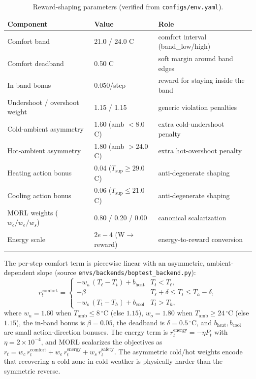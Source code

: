 \documentclass[11pt,a4paper]{article}
\begin{document}
\begin{table}[H]
\centering
\caption{Reward-shaping parameters (verified from \texttt{configs/env.yaml}).}
\label{tab:reward}
\small
\begin{tabularx}{\linewidth}{llX}
\toprule
Component & Value & Role \\
\midrule
Comfort band & 21.0 / 24.0 C & comfort interval (band\_low/high) \\
Comfort deadband & 0.50 C & soft margin around band edges \\
In-band bonus & 0.050/step & reward for staying inside the band \\
Undershoot / overshoot weight & 1.15 / 1.15 & generic violation penalties \\
Cold-ambient asymmetry & 1.60 (amb $<8.0$ C) & extra cold-undershoot penalty \\
Hot-ambient asymmetry & 1.80 (amb $>24.0$ C) & extra hot-overshoot penalty \\
Heating action bonus & 0.04 ($T_{\mathrm{sup}}\ge 29.0$ C) & anti-degenerate shaping \\
Cooling action bonus & 0.06 ($T_{\mathrm{sup}}\le 21.0$ C) & anti-degenerate shaping \\
MORL weights ($w_c/w_e/w_s$) & 0.80 / 0.20 / 0.00 & canonical scalarization \\
Energy scale & $2e-4$ (W$\to$reward) & energy-to-reward conversion \\
\bottomrule
\end{tabularx}
\end{table}

The per-step comfort term is piecewise linear with an asymmetric, ambient-dependent slope (source \texttt{envs/backends/boptest\_backend.py}):
\begin{equation}
  r^{\mathrm{comfort}}_t =
  \begin{cases}
    -w_u\,(T_{\ell} - T_t) + b_{\mathrm{heat}} & T_t < T_{\ell}, \\
    +\beta & T_{\ell}+\delta \le T_t \le T_h-\delta, \\
    -w_o\,(T_t - T_h) + b_{\mathrm{cool}} & T_t > T_h,
  \end{cases}
  \label{eq:comfort}
\end{equation}
where $w_u=1.60$ when $T_{\mathrm{amb}}\le 8\,^\circ$C (else $1.15$), $w_o=1.80$ when $T_{\mathrm{amb}}\ge 24\,^\circ$C (else $1.15$), the in-band bonus is $\beta=0.05$, the deadband is $\delta=0.5\,^\circ$C, and $b_{\mathrm{heat}},b_{\mathrm{cool}}$ are small action-direction bonuses. The energy term is $r^{\mathrm{energy}}_t=-\eta P_t$ with $\eta=2\times10^{-4}$, and MORL scalarizes the objectives as $r_t = w_c\,r^{\mathrm{comfort}}_t + w_e\,r^{\mathrm{energy}}_t + w_s\,r^{\mathrm{safety}}_t$. The asymmetric cold/hot weights encode that recovering a cold zone in cold weather is physically harder than the symmetric reverse.
\end{document}
